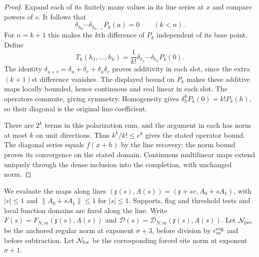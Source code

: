 \begin{proof}
Expand each of its finitely many values in its line series at $x$ and compare powers of $s$. It follows that
\begin{equation*}
\delta_{h_0}\cdots\delta_{h_{n-1}}P_k(a)=0\qquad(k<n).
\end{equation*}
For $n=k+1$ this makes the $k$th difference of $P_k$ independent of its base point. Define
\begin{equation*}
T_k(h_1,\ldots,h_k)=\frac1{k!}
\delta_{h_1}\cdots\delta_{h_k}P_k(0).
\end{equation*}
The identity $\delta_{u+v}=\delta_u+\delta_v+\delta_u\delta_v$ proves additivity in each slot, since the extra $(k+1)$st difference vanishes. The displayed bound on $P_k$ makes these additive maps locally bounded, hence continuous and real linear in each slot. The operators commute, giving symmetry. Homogeneity gives $\delta_h^kP_k(0)=k!P_k(h)$, so their diagonal is the original line coefficient.

There are $2^k$ terms in this polarization sum, and the argument in each has norm at most $k$ on unit directions. Thus $k^k/k!\le e^k$ gives the stated operator bound. The diagonal series equals $f(x+h)$ by the line recovery; the norm bound proves its convergence on the stated domain. Continuous multilinear maps extend uniquely through the dense inclusion into the completion, with unchanged norm.
\end{proof}

We evaluate the maps along lines $(\mathfrak x(s),A(s))=(\mathfrak x+sv,A_0+sA_1)$, with $|v|\le1$ and $\|A_0+sA_1\|\le1$ for $|s|\le1$. Supports, flag and threshold tests and local function domains are fixed along the line. Write $F(s)=F_{N,m}(\mathfrak x(s),A(s))$ and $\mathcal D(s)=\mathcal D_{N,m}(\mathfrak x(s),A(s))$. Let $\mathcal N_{\rm pre}$ be the anchored regular norm at exponent $\sigma+3$, before division by $\epsilon_m^{\rm reg}$ and before subtraction. Let $\mathcal N_{\rm for}$ be the corresponding forced site norm at exponent $\sigma+1$.

